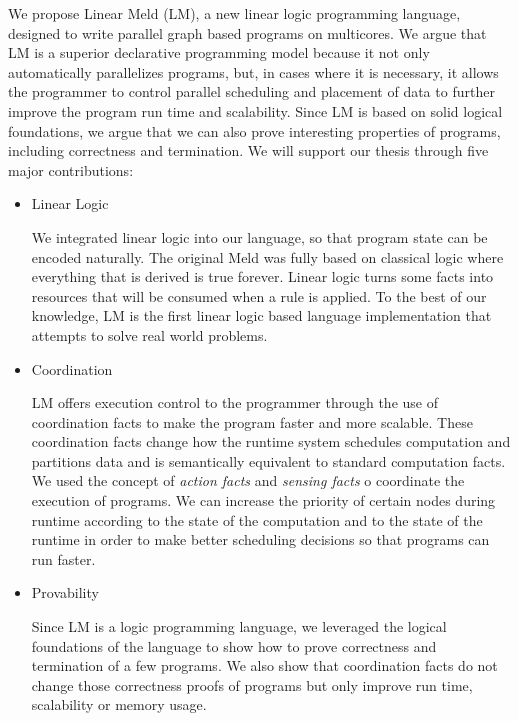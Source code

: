 
We propose Linear Meld (LM), a new linear logic programming language, designed
to write parallel graph based programs on multicores.  We argue that LM is a
superior declarative programming model because it not only automatically
parallelizes programs, but, in cases where it is necessary, it allows the
programmer to control parallel scheduling and placement of data to further
improve the program run time and scalability.  Since LM is based on solid
logical foundations, we argue that we can also prove interesting properties of
programs, including correctness and termination. We will support our thesis
through five major contributions:

\begin{itemize}
   
   \item Linear Logic

   We integrated linear logic into our language, so that program state can be
   encoded naturally. The original Meld was fully based on classical logic where
   everything that is derived is true forever. Linear logic turns some facts
   into resources that will be consumed when a rule is applied.  To the best of
   our knowledge, LM is the first linear logic based language implementation
   that attempts to solve real world problems.


   \item Coordination
   
   LM offers execution control to the programmer through the use of coordination
   facts to make the program faster and more scalable. These coordination facts
   change how the runtime system schedules computation and partitions data and
   is semantically equivalent to standard computation facts.  We used the
   concept of \emph{action facts} and \emph{sensing facts} o coordinate the
   execution of programs.  We can increase the priority of certain nodes during
   runtime according to the state of the computation and to the state of the
   runtime in order to make better scheduling decisions so that programs can run
   faster.
   
   \item Provability
   
   Since LM is a logic programming language, we leveraged the logical
   foundations of the language to show how to prove correctness and termination of a few
   programs. We also show that coordination facts do not change those
   correctness proofs of programs but only improve run time, scalability or
   memory usage.


\end{itemize}
